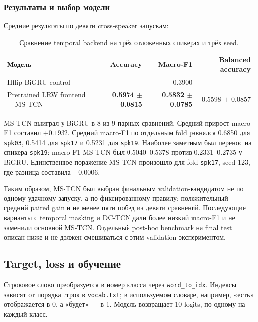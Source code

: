 \documentclass[12pt,a4paper]{article}
\begin{document}
\subsubsection{Результаты и выбор модели}

Средние результаты по девяти cross-speaker запускам:

\begin{table}[htbp]
\centering
\begin{tabularx}{\textwidth}{>{\raggedright\arraybackslash}Xrrr}
\toprule
Модель & Accuracy & Macro-F1 & Balanced accuracy \\
\midrule
Hflip BiGRU control & --- & 0.3900 & --- \\
Pretrained LRW frontend + MS-TCN & \textbf{0.5974 $\pm$ 0.0815} & \textbf{0.5832 $\pm$ 0.0785} & 0.5598 $\pm$ 0.0857 \\
\bottomrule
\end{tabularx}
\caption{Сравнение temporal backend на трёх отложенных спикерах и трёх seed.}
\end{table}

MS-TCN выиграл у BiGRU в 8 из 9 парных сравнений. Средний прирост
macro-F1 составил $+0.1932$. Средний macro-F1 по отдельным fold равнялся
0.6850 для \texttt{spk03}, 0.5414 для \texttt{spk17} и 0.5231 для
\texttt{spk19}. Наиболее заметным был перенос на спикера
\texttt{spk19}: macro-F1 MS-TCN был 0.5040--0.5378 против 0.2331--0.2735 у
BiGRU. Единственное поражение MS-TCN произошло для fold \texttt{spk17},
seed 123, где разница составила $-0.0006$.

Таким образом, MS-TCN был выбран финальным validation-кандидатом не по одному
удачному запуску, а по фиксированному правилу: положительный средний paired
gain и не менее пяти побед из девяти сравнений. Последующие варианты с
temporal masking и DC-TCN дали более низкий macro-F1 и не заменили основной
MS-TCN. Отдельный post-hoc benchmark на final test описан ниже и не должен
смешиваться с этим validation-экспериментом.

\subsection{Target, loss и обучение}

Строковое слово преобразуется в номер класса через \texttt{word\_to\_idx}.
Индексы зависят от порядка строк в \texttt{vocab.txt}; в используемом
словаре, например, «есть» отображается в 0, а «будет» --- в 1. Модель
возвращает 10 logits, по одному на каждый класс.
\end{document}
